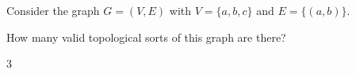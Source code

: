 \begin{prob}
    Consider the graph $G = (V, E)$ with $V = \{a, b, c\}$ and $E = \{(a, b)\}$.

    How many valid topological sorts of this graph are there?

    \begin{soln}
        3
    \end{soln}

\end{prob}
